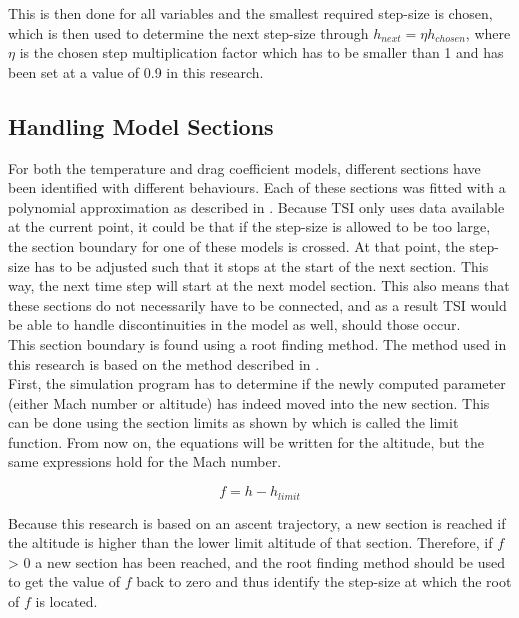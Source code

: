 \noindent
This is then done for all variables and the smallest required step-size is chosen, which is then used to determine the next step-size through $h_{next}=\eta h_{chosen}$, where $\eta$ is the chosen step multiplication factor which has to be smaller than 1 and has been set at a value of 0.9 in this research. 


\subsection{Handling Model Sections}
\label{subsec:handlingModelSections}
For both the temperature and drag coefficient models, different sections have been identified with different behaviours. Each of these sections was fitted with a polynomial approximation as described in . Because \ac{TSI} only uses data available at the current point, it could be that if the step-size is allowed to be too large, the section boundary for one of these models is crossed. At that point, the step-size has to be adjusted such that it stops at the start of the next section. This way, the next time step will start at the next model section. This also means that these sections do not necessarily have to be connected, and as a result \ac{TSI} would be able to handle discontinuities in the model as well, should those occur. \\
This section boundary is found using a root finding method. The method used in this research is based on the method described in \cite{bergsma2015application}. \\

\noindent
First, the simulation program has to determine if the newly computed parameter (either Mach number or altitude) has indeed moved into the new section. This can be done using the section limits as shown by  which is called the limit function. From now on, the equations will be written for the altitude, but the same expressions hold for the Mach number.

\begin{equation} \label{eq:limitFunction}
f = h-h_{limit}
\end{equation}


\noindent
Because this research is based on an ascent trajectory, a new section is reached if the altitude is higher than the lower limit altitude of that section. Therefore, if $f$ > 0 a new section has been reached, and the root finding method should be used to get the value of $f$ back to zero and thus identify the step-size at which the root of $f$ is located.\\

